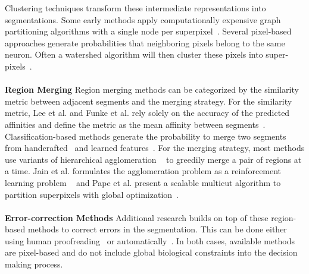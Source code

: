 Clustering techniques transform these intermediate representations into segmentations.
Some early methods apply computationally expensive graph partitioning algorithms with a single node per superpixel~\cite{andres2012globally}.
Several pixel-based approaches generate probabilities that neighboring pixels belong to the same neuron.
Often a watershed algorithm will then cluster these pixels into super-pixels~\cite{zlateski2015image}.
\\~\\
\noindent\textbf{Region Merging}
Region merging methods can be categorized by the similarity metric between adjacent segments and the merging strategy.
For the similarity metric, Lee et al. and Funke et al. rely solely on the accuracy of the predicted affinities and define the metric as the mean affinity between segments~\cite{lee2017superhuman,funke2017deep}.
Classification-based methods generate the probability to merge two segments from handcrafted~\cite{seymour2016rhoananet,nunez2014graph,parag2017anisotropic,zlateski2015image,10.1371/journal.pone.0125825,jain2011learning} and learned features~\cite{bogovic2013learned}. 
For the merging strategy, most methods use variants of hierarchical agglomeration ~\cite{seymour2016rhoananet,nunez2014graph,parag2017anisotropic,zlateski2015image,10.1371/journal.pone.0125825} to greedily merge a pair of regions at a time.
Jain et al. formulates the agglomeration problem as a reinforcement learning problem ~\cite{jain2011learning} and Pape et al. present a scalable multicut algorithm to partition superpixels with global optimization~\cite{beier2017multicut}.
\\~\\
\noindent\textbf{Error-correction Methods}
 Additional research builds on top of these region-based methods to correct errors in the segmentation. This can be done either using human proofreading~\cite{haehn2014design,haehn2017guided,mojo2} or automatically~\cite{rolnick2017morphological,error_correction_using_CNN}. In both cases, available methods are pixel-based and do not include global biological constraints into the decision making process.  




